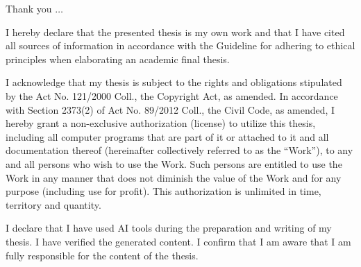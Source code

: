 \documentclass[english,bachelor,unicode,oneside]{ctufit-thesis}
\begin{document}
\frontmatter\frontmatterinit

\thispagestyle{empty}\maketitle\thispagestyle{empty}\cleardoublepage



\imprintpage
\stopTOCentries

\begin{acknowledgmentpage}
	Thank you \(\dots\)
\end{acknowledgmentpage}

\begin{declarationpage}
  I hereby declare that the presented thesis is my own work and that I have cited all sources of information in accordance with the Guideline for adhering to ethical principles when elaborating an academic final thesis.

  I acknowledge that my thesis is subject to the rights and obligations stipulated by the Act No. 121/2000 Coll., the Copyright Act, as amended. In accordance with Section 2373(2) of Act No. 89/2012 Coll., the Civil Code, as amended, I hereby grant a non-exclusive authorization (license) to utilize this thesis, including all computer programs that are part of it or attached to it and all documentation thereof (hereinafter collectively referred to as the ``Work''), to any and all persons who wish to use the Work. Such persons are entitled to use the Work in any manner that does not diminish the value of the Work and for any purpose (including use for profit). This authorization is unlimited in time, territory and quantity.

  I declare that I have used AI tools during the preparation and writing of my thesis. I have verified the generated content. I confirm that I am aware that I am fully responsible for the content of the thesis.
\end{declarationpage}

\newcommand{\printczechabstractpage}{%
\begin{abstractpage}
\begin{abstrakt}%
\begin{sloppypar}\noindent
\thectufitabstrakt
\end{sloppypar}
\end{abstrakt}

\vskip 0.5cm

{\noindent\color{heading}\bfseries Klíčová slova\hspace{1em}}{\thectufitklicovaslova}
\end{abstractpage}
\cleardoublepage
}
\end{document}
